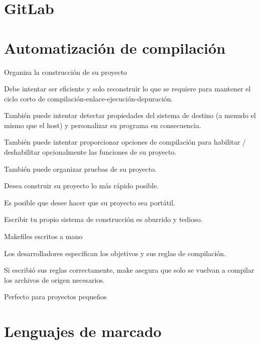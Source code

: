 \section{GitLab}
\lipsum[1]
\begin{figure}
	
\end{figure}
\lipsum[1]

\section{Automatización de compilación}

Organiza la construcción de su proyecto

Debe intentar ser eficiente y solo reconstruir lo que se requiere para mantener el ciclo corto de compilación-enlace-ejecución-depuración.

También puede intentar detectar propiedades del sistema de destino (a menudo el mismo que el host) y personalizar su programa en consecuencia.

También puede intentar proporcionar opciones de compilación para habilitar / deshabilitar opcionalmente las funciones de su proyecto.

También puede organizar pruebas de su proyecto.

Desea construir su proyecto lo más rápido posible.

Es posible que desee hacer que su proyecto sea portátil.

Escribir tu propio sistema de construcción es aburrido y tedioso.

Makefiles escritos a mano

Los desarrolladores especifican los objetivos y sus reglas de compilación.

Si escribió sus reglas correctamente, make asegura que solo se vuelvan a compilar los archivos de origen necesarios.

Perfecto para proyectos pequeños
\section{Lenguajes de marcado}

